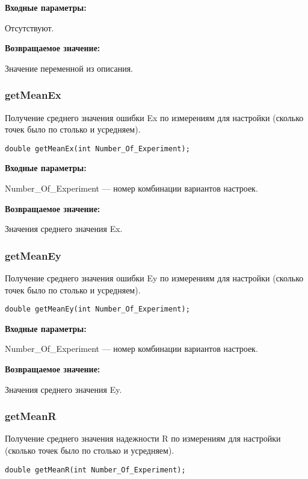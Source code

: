 \documentclass[a4paper,12pt]{article}
\begin{document}
\textbf{Входные параметры:}

Отсутствуют.

\textbf{Возвращаемое значение:}

Значение переменной из описания.


\subsubsection{getMeanEx}\label{getMeanEx}

Получение среднего значения ошибки Ex по измерениям для настройки (сколько точек было по столько и усредняем).


\begin{lstlisting}[label=code_syntax_getMeanEx,caption=Синтаксис]
double getMeanEx(int Number_Of_Experiment);
\end{lstlisting}

\textbf{Входные параметры:}

Number\_Of\_Experiment --- номер комбинации вариантов настроек.

\textbf{Возвращаемое значение:}

Значения среднего значения Ex.


\subsubsection{getMeanEy}\label{getMeanEy}

Получение среднего значения ошибки Ey по измерениям для настройки (сколько точек было по столько и усредняем).


\begin{lstlisting}[label=code_syntax_getMeanEy,caption=Синтаксис]
double getMeanEy(int Number_Of_Experiment);
\end{lstlisting}

\textbf{Входные параметры:}

Number\_Of\_Experiment --- номер комбинации вариантов настроек.

\textbf{Возвращаемое значение:}

Значения среднего значения Ey.


\subsubsection{getMeanR}\label{getMeanR}

Получение среднего значения надежности R по измерениям для настройки (сколько точек было по столько и усредняем).


\begin{lstlisting}[label=code_syntax_getMeanR,caption=Синтаксис]
double getMeanR(int Number_Of_Experiment);
\end{lstlisting}
\end{document}
